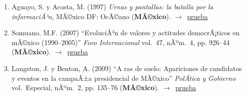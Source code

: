 \documentclass[12 pt, letter]{article}
\newenvironment{CitasMiTrabajo}{
    \begin{footnotesize}
    \begin{enumerate}[label={\footnotesize\emph{cita~\arabic*}},ref=\arabic*] %
        \setlength{\itemsep}{.1\itemsep}
        \setlength{\parskip}{.1\parskip}
    }{\end{enumerate}\end{footnotesize}}
\begin{document}
        \begin{CitasMiTrabajo}

        \item Aguayo, S. y Acosta, M. (1997) \emph{Urnas y pantallas: la batalla por la informaciÃ³n}, 
        MÃ©xico DF: OcÃ©ano (\textbf{MÃ©xico}). $\rightarrow$~\href{http://ericmagar.com/cv/cites/magarMolinar/aguayoUrnasPantallas.pdf}{prueba}

        \item Somuano, M.F. (2007) ``EvoluciÃ³n de valores y actitudes democrÃ¡ticos en mÃ©xico (1990--2005)''
            \emph{Foro Internacional} vol.\ 47, nÃºm.\ 4, pp. 926--44 (\textbf{MÃ©xico}). $\rightarrow$~\href{http://ericmagar.com/cv/cites/magarMolinar/somuano2007fi.pdf}{prueba}

        \item Langston, J. y Benton, A. (2009) ``A ras de suelo: Apariciones de candidatos y eventos en la campaÃ±a presidencial de MÃ©xico'' \emph{PolÃ­tica y Gobierno} vol.\ Especial, nÃºm.\ 2, pp. 135--76 (\textbf{MÃ©xico}). $\rightarrow$~\href{http://ericmagar.com/cv/cites/magarMolinar/langston+Benton2009pyg.pdf}{prueba}

        \label{ncites:magar.molinar.1995} %


        \end{CitasMiTrabajo}





\end{document}
